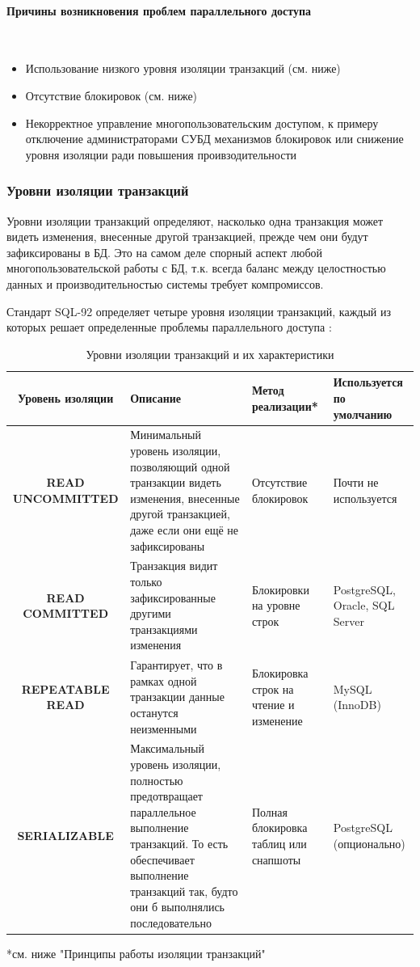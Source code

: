\paragraph{Причины возникновения проблем параллельного доступа} ~\\
\begin{itemize}
    \item Использование низкого уровня изоляции транзакций (см. ниже)
    \item Отсутствие блокировок (см. ниже)
    \item Некорректное управление многопользовательским доступом, к примеру отключение администраторами СУБД механизмов блокировок или снижение уровня изоляции ради повышения проивзодительности
\end{itemize}

\subsubsection{Уровни изоляции транзакций}

Уровни изоляции транзакций определяют, насколько одна транзакция может видеть изменения, внесенные другой транзакцией, прежде чем они будут зафиксированы в БД. Это на самом деле спорный аспект любой многопользовательской работы с БД, т.к. всегда баланс между целостностью данных и производительностью системы требует компромиссов.

Стандарт SQL-92 определяет четыре уровня изоляции транзакций, каждый из которых решает определенные проблемы параллельного доступа \autocite{ElmasriNavathe, Silberschatz}:

\begin{table}[H]
    \centering
    \begin{tabular}{|c|p{4.25cm}|p{3.25cm}|p{3cm}|}
        \hline
        \textbf{Уровень изоляции} & \textbf{Описание} & \textbf{Метод реализации*} & \textbf{Используется по умолчанию} \\
        \hline
        \textbf{READ UNCOMMITTED} & Минимальный уровень изоляции, позволяющий одной транзакции видеть изменения, внесенные другой транзакцией, даже если они ещё не зафиксированы & Отсутствие блокировок & Почти не используется \\
        \hline
        \textbf{READ COMMITTED} & Транзакция видит только зафиксированные другими транзакциями изменения & Блокировки на уровне строк & PostgreSQL, Oracle, SQL Server \\
        \hline
        \textbf{REPEATABLE READ} & Гарантирует, что в рамках одной транзакции данные останутся неизменными & Блокировка строк на чтение и изменение & MySQL (InnoDB) \\
        \hline
        \textbf{SERIALIZABLE} & Максимальный уровень изоляции, полностью предотвращает параллельное выполнение транзакций. То есть обеспечивает выполнение транзакций так, будто они б выполнялись последовательно & Полная блокировка таблиц или снапшоты & PostgreSQL (опционально) \\
        \hline
    \end{tabular}
    \caption{Уровни изоляции транзакций и их характеристики}
    \label{tab:isolation_levels}
\end{table}
 *см. ниже "Принципы работы изоляции транзакций"

